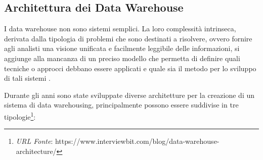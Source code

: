 \subsection{Architettura dei Data Warehouse}

I data warehouse non sono sistemi semplici. La loro complessità intrinseca, derivata dalla tipologia di problemi che sono destinati a risolvere, ovvero fornire agli analisti una visione unificata e facilmente leggibile delle informazioni, si aggiunge alla mancanza di un preciso modello che permetta di definire quali tecniche o approcci debbano essere applicati e quale sia il metodo per lo sviluppo di tali sistemi \cite{kelly_data_warehousing_in_action}.

Durante gli anni sono state sviluppate diverse architetture per la creazione di un sistema di data warehousing, principalmente possono essere suddivise in tre tipologie\footnote{\textit{URL Fonte}: https://www.interviewbit.com/blog/data-warehouse-architecture/}:

